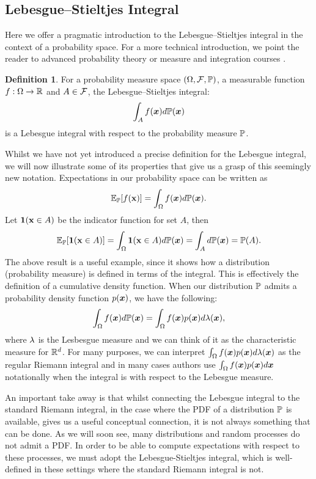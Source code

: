 \documentclass[a4paper,12pt,twoside,openright]{report}
\theoremstyle{definition}
\newtheorem{definition}{Definition}[section]
\begin{document}
\subsection{Lebesgue–Stieltjes Integral}
Here we offer a pragmatic introduction to the Lebesgue–Stieltjes integral in the context of a probability space. For a more technical introduction, we point the reader to advanced probability theory or measure and integration courses \citep{ethmeasure,mitmeasure,cambprob}.
\begin{definition}\label{def:lebesgue}
For a probability measure space $\probspace$, a measurable function $f: \Omega \rightarrow \R $ and $A \in \calF$, the Lebesgue–Stieltjes integral:
\begin{align}
    \int_{A} f(\vx) d\P(\vx)
\end{align}
is a Lebesgue integral with respect to the probability measure $\P$.
\end{definition}
Whilst we have not yet introduced a precise definition for the Lebesgue integral, we will now illustrate some of its properties that give us a grasp of this seemingly new notation.
Expectations in our probability space can be written as
\begin{align}
     \E_{\P}[f(\rvx)] = \int_{\Omega} f(\vx) d\P(\vx).
\end{align}
Let $\ind(\rvx \in A)$ be the indicator function for set $A$, then
\begin{align}
    \E_{\P}[\ind(\rvx \in A)] = \int_{\Omega} \ind(\rvx \in A) d\P(\vx) = \int_{A} d\P(\vx) = \P(A).
\end{align}
The above result is a useful example, since it shows how a distribution (probability measure) is defined in terms of the integral. This is effectively  the definition of a cumulative density function.
When our distribution $\P$ admits a probability density function $p(\vx)$, we have the following:
\begin{align}
    \int_{\Omega} f(\vx) d\P(\vx) = \int_{\Omega} f(\vx)p(\vx) d\callambda(\vx),
\end{align}
where $\callambda$ is the Lesbesgue measure and we can think of it as the characteristic measure for $\R^d$. For many purposes, we can interpret $\int_{\Omega} f(\vx)p(\vx) d\callambda(\vx)$ as the regular Riemann integral and in many cases authors \citep{williams2006gaussian} use $\int_{\Omega} f(\vx)p(\vx) d\vx$ notationally when the integral is with respect to the Lebesgue measure.

An important take away is that whilst connecting the Lebesgue integral to the standard Riemann integral, in the case where the PDF of a distribution $\P$ is available, gives us a useful conceptual connection, it is not always something that can be done. As we will soon see, many distributions and random processes do not admit a PDF. In order to be able to compute expectations with respect to these processes, we must adopt the Lebesgue-Stieltjes integral, which is well-defined in these settings where the standard Riemann integral is not.
\end{document}
